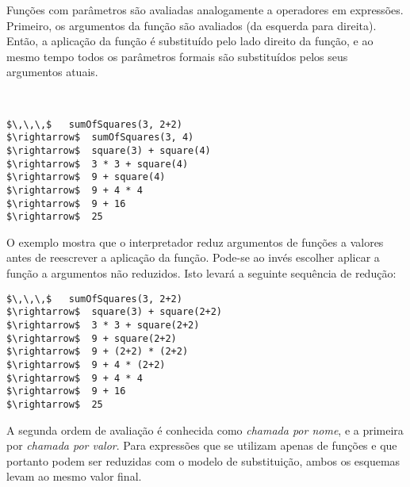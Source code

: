 Fun\c{c}\~{o}es com par\^{a}metros s\~{a}o avaliadas analogamente a operadores em express\~{o}es.
Primeiro, os argumentos da fun\c{c}\~{a}o s\~{a}o avaliados (da esquerda para direita). 
Ent\~{a}o, a aplica\c{c}\~{a}o da fun\c{c}\~{a}o \'{e} substitu\'{i}do pelo lado direito da fun\c{c}\~{a}o, e
ao mesmo tempo todos os par\^{a}metros formais s\~{a}o substitu\'{i}dos pelos seus 
argumentos atuais. 

\example\ 
 
\begin{lstlisting}
$\,\,\,$   sumOfSquares(3, 2+2)
$\rightarrow$  sumOfSquares(3, 4)
$\rightarrow$  square(3) + square(4)
$\rightarrow$  3 * 3 + square(4)
$\rightarrow$  9 + square(4)
$\rightarrow$  9 + 4 * 4
$\rightarrow$  9 + 16
$\rightarrow$  25
\end{lstlisting}

O exemplo mostra que o interpretador reduz argumentos de fun\c{c}\~{o}es a valores 
antes de reescrever a aplica\c{c}\~{a}o da fun\c{c}\~{a}o. Pode-se ao inv\'{e}s escolher aplicar
a fun\c{c}\~{a}o a argumentos n\~{a}o reduzidos. Isto levar\'{a} a seguinte sequ\^{e}ncia de 
redu\c{c}\~{a}o: 

\begin{lstlisting}
$\,\,\,$   sumOfSquares(3, 2+2)
$\rightarrow$  square(3) + square(2+2)
$\rightarrow$  3 * 3 + square(2+2)
$\rightarrow$  9 + square(2+2)
$\rightarrow$  9 + (2+2) * (2+2)
$\rightarrow$  9 + 4 * (2+2)
$\rightarrow$  9 + 4 * 4
$\rightarrow$  9 + 16
$\rightarrow$  25
\end{lstlisting}
A segunda ordem de avalia\c{c}\~{a}o \'{e} conhecida como \emph{chamada por nome},
e a primeira por \emph{chamada por valor}. Para express\~{o}es que se utilizam
apenas de fun\c{c}\~{o}es e que portanto podem ser reduzidas com o modelo de 
substitui\c{c}\~{a}o, ambos os esquemas levam ao mesmo valor final.

